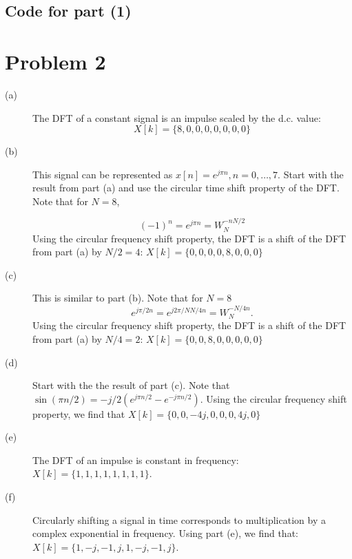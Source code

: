 \documentclass{article}
\begin{document}
\subsection{Code for part (1)}


\section{Problem 2}

\begin{description}
	\item[(a)] The DFT of a constant signal is an impulse scaled by the d.c. value: 
	\begin{equation}
		X[k] = \{8, 0, 0, 0, 0, 0, 0, 0\}
	\end{equation}
	
	\item[(b)] This signal can be represented as  $x[n] = e^{j\pi n}, n = 0, \ldots, 7$. Start with the result from part (a) and use the circular time shift property of the DFT. Note that for $N = 8$, 
	
	\begin{equation}
	(-1)^n = e^{j\pi n} = W_N^{-nN/2}
	\end{equation}
	Using the circular frequency shift property, the DFT is a shift of the DFT from part (a) by $N/2 = 4$: $X[k] = \{0, 0, 0, 0, 8, 0, 0, 0\}$
	
	\item[(c)] This is similar to part (b). Note that for $N = 8$
	\begin{equation}
	e^{j\pi/2n} = e^{j2\pi/N N/4n} = W_N^{-N/4n}.
	\end{equation}
	Using the circular frequency shift property, the DFT is a shift of the DFT from part (a) by $N/4 = 2$: $X[k] = \{0, 0, 8, 0, 0, 0, 0, 0\}$
	
	\item[(d)] Start with the the result of part (c). Note that $\sin(\pi n/2) = -j/2(e^{j\pi n/2} - e^{-j\pi n/2})$. Using the circular frequency shift property, we find that $X[k] = \{0, 0, -4j, 0, 0, 0, 4j, 0\}$
	
	\item[(e)] The DFT of an impulse is constant in frequency: $X[k] = \{1, 1, 1, 1, 1, 1, 1, 1\}$.
	
	\item[(f)] Circularly shifting a signal in time corresponds to multiplication by a complex exponential in frequency. Using part (e), we find that: $X[k] = \{1, -j, -1, j, 1, -j, -1, j\}$.  
\end{description}
\end{document}
